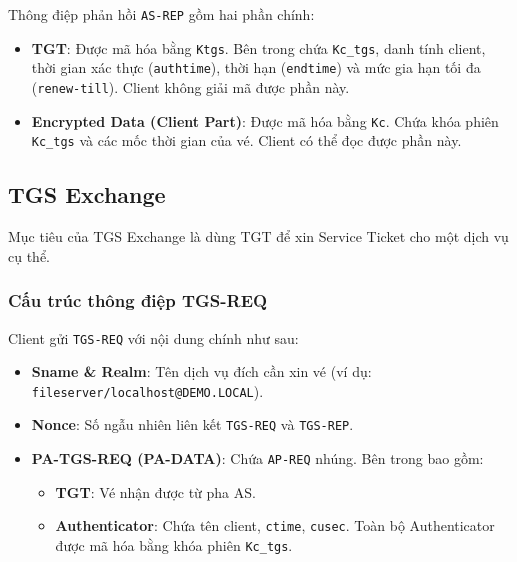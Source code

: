 \documentclass[12pt]{article}
\begin{document}
Thông điệp phản hồi \texttt{AS-REP} gồm hai phần chính:
\begin{itemize}
    \item \textbf{TGT}: Được mã hóa bằng \texttt{Ktgs}. Bên trong chứa \texttt{Kc\_tgs}, danh tính client, thời gian xác thực (\texttt{authtime}), thời hạn (\texttt{endtime}) và mức gia hạn tối đa (\texttt{renew-till}). Client không giải mã được phần này.
    \item \textbf{Encrypted Data (Client Part)}: Được mã hóa bằng \texttt{Kc}. Chứa khóa phiên \texttt{Kc\_tgs} và các mốc thời gian của vé. Client có thể đọc được phần này.
\end{itemize}

\subsection{TGS Exchange}

Mục tiêu của TGS Exchange là dùng TGT để xin Service Ticket cho một dịch vụ cụ thể.

\subsubsection{Cấu trúc thông điệp TGS-REQ}
Client gửi \texttt{TGS-REQ} với nội dung chính như sau:
\begin{itemize}
    \item \textbf{Sname \& Realm}: Tên dịch vụ đích cần xin vé (ví dụ: \texttt{fileserver/localhost@DEMO.LOCAL}).
    \item \textbf{Nonce}: Số ngẫu nhiên liên kết \texttt{TGS-REQ} và \texttt{TGS-REP}.
    \item \textbf{PA-TGS-REQ (PA-DATA)}: Chứa \texttt{AP-REQ} nhúng. Bên trong bao gồm:
    \begin{itemize}
        \item \textbf{TGT}: Vé nhận được từ pha AS.
        \item \textbf{Authenticator}: Chứa tên client, \texttt{ctime}, \texttt{cusec}. Toàn bộ Authenticator được mã hóa bằng khóa phiên \texttt{Kc\_tgs}.
    \end{itemize}
\end{itemize}
\end{document}
